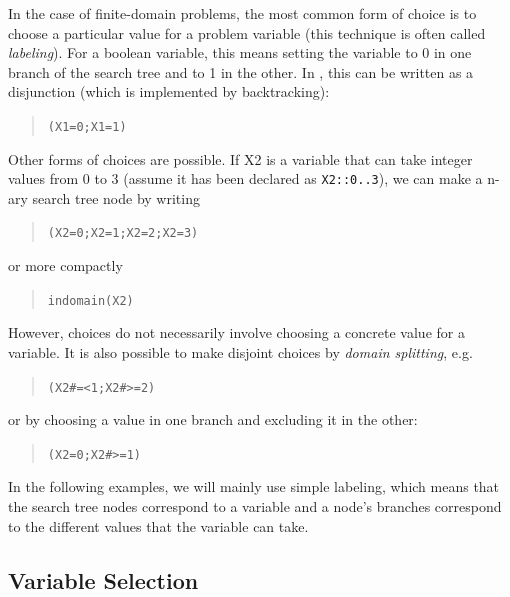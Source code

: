 In the case of finite-domain problems, the most common form of choice
is to choose a particular value for a problem variable
(this technique is often called
{\em labeling}).
For a boolean variable, this means setting the variable to 0 in one
branch of the search tree and to 1 in the other.
In {\eclipse}, this can be written as a disjunction
(which is implemented by backtracking):
\begin{quote}\begin{alltt}
( X1=0 ; X1=1 )
\end{alltt}\end{quote}
Other forms of choices are possible. If X2 is a variable that can take
integer values from 0 to 3 (assume it has been declared as \verb'X2::0..3'),
we can make a n-ary search tree node by writing
\begin{quote}\begin{alltt}
( X2=0 ; X2=1 ; X2=2 ; X2=3 )
\end{alltt}\end{quote}
or more compactly
\begin{quote}\begin{alltt}
indomain(X2)
\end{alltt}\end{quote}
However, choices do not necessarily involve choosing a concrete value
for a variable. It is also possible to make disjoint choices by
{\em domain splitting}, e.g.
\begin{quote}\begin{alltt}
( X2 #=< 1 ; X2 #>= 2 )
\end{alltt}\end{quote}
or by choosing a value in one branch and excluding it in the other:
\begin{quote}\begin{alltt}
( X2 = 0 ; X2 #>= 1 )
\end{alltt}\end{quote}
In the following examples, we will mainly use simple labeling,
which means that the search tree nodes correspond to a variable
and a node's branches correspond to the different values that the
variable can take.


\subsection{Variable Selection}

